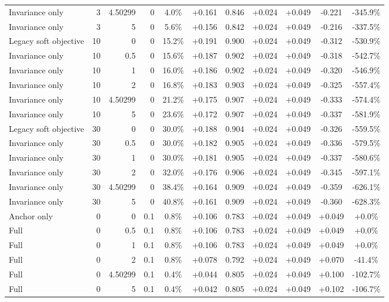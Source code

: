\begin{table}[htbp]
\begin{tabular}{lrrrccccccc}
Invariance only & 3 & 4.50299 & 0 & 4.0\% & +0.161 & 0.846 & +0.024 & +0.049 & -0.221 & -345.9\% \\
Invariance only & 3 & 5 & 0 & 5.6\% & +0.156 & 0.842 & +0.024 & +0.049 & -0.216 & -337.5\% \\
Legacy soft objective & 10 & 0 & 0 & 15.2\% & +0.191 & 0.900 & +0.024 & +0.049 & -0.312 & -530.9\% \\
Invariance only & 10 & 0.5 & 0 & 15.6\% & +0.187 & 0.902 & +0.024 & +0.049 & -0.318 & -542.7\% \\
Invariance only & 10 & 1 & 0 & 16.0\% & +0.186 & 0.902 & +0.024 & +0.049 & -0.320 & -546.9\% \\
Invariance only & 10 & 2 & 0 & 16.8\% & +0.183 & 0.903 & +0.024 & +0.049 & -0.325 & -557.4\% \\
Invariance only & 10 & 4.50299 & 0 & 21.2\% & +0.175 & 0.907 & +0.024 & +0.049 & -0.333 & -574.4\% \\
Invariance only & 10 & 5 & 0 & 23.6\% & +0.172 & 0.907 & +0.024 & +0.049 & -0.337 & -581.9\% \\
Legacy soft objective & 30 & 0 & 0 & 30.0\% & +0.188 & 0.904 & +0.024 & +0.049 & -0.326 & -559.5\% \\
Invariance only & 30 & 0.5 & 0 & 30.0\% & +0.182 & 0.905 & +0.024 & +0.049 & -0.336 & -579.5\% \\
Invariance only & 30 & 1 & 0 & 30.0\% & +0.181 & 0.905 & +0.024 & +0.049 & -0.337 & -580.6\% \\
Invariance only & 30 & 2 & 0 & 32.0\% & +0.176 & 0.906 & +0.024 & +0.049 & -0.345 & -597.1\% \\
Invariance only & 30 & 4.50299 & 0 & 38.4\% & +0.164 & 0.909 & +0.024 & +0.049 & -0.359 & -626.1\% \\
Invariance only & 30 & 5 & 0 & 40.8\% & +0.161 & 0.909 & +0.024 & +0.049 & -0.360 & -628.3\% \\
Anchor only & 0 & 0 & 0.1 & 0.8\% & +0.106 & 0.783 & +0.024 & +0.049 & +0.049 & +0.0\% \\
Full & 0 & 0.5 & 0.1 & 0.8\% & +0.106 & 0.783 & +0.024 & +0.049 & +0.049 & +0.0\% \\
Full & 0 & 1 & 0.1 & 0.8\% & +0.106 & 0.783 & +0.024 & +0.049 & +0.049 & +0.0\% \\
Full & 0 & 2 & 0.1 & 0.8\% & +0.078 & 0.792 & +0.024 & +0.049 & +0.070 & -41.4\% \\
Full & 0 & 4.50299 & 0.1 & 0.4\% & +0.044 & 0.805 & +0.024 & +0.049 & +0.100 & -102.7\% \\
Full & 0 & 5 & 0.1 & 0.4\% & +0.042 & 0.805 & +0.024 & +0.049 & +0.102 & -106.7\% \\

\end{tabular}
\end{table}
